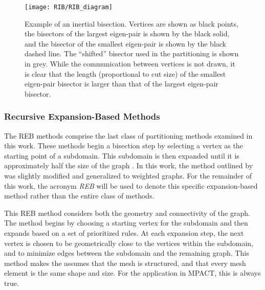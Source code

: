 {{{{        \begin{figure}
          \centering
          \texttt{[image: RIB/RIB\_diagram]}
          \caption{
            Example of an inertial bisection.
            Vertices are shown as black points, the bisectors of the largest eigen-pair is shown by the black solid, and the bisector of the smallest eigen-pair is shown by the black dashed line.
            The ``shifted'' bisector used in the partitioning is shown in grey.
            While the communication between vertices is not drawn, it is clear that the length (proportional to cut size) of the smallest eigen-pair bisector is larger than that of the largest eigen-pair bisector.
            \label{fig:Spatial Decomposition:RIB Diagram}
          }
        \end{figure}
      }
      \subsubsection{Recursive Expansion-Based Methods}{\label{sssec:Spatial Decomposition:Recursive Expansion-Based Methods}
        The \ac{REB} methods comprise the last class of partitioning methods examined in this work.
        These methods begin a bisection step by selecting a vertex as the starting point of a subdomain.
        This subdomain is then expanded until it is approximately half the size of the graph \cite{Farhat1988,Nasra1991,Elsner1997,Fitzgerald2017}.
        In this work, the method outlined by \citet{Fitzgerald2017} was slightly modified and generalized to weighted graphs.
        For the remainder of this work, the acronym \emph{\ac{REB}} will be used to denote this specific expansion-based method rather than the entire class of methods.

        This \ac{REB} method considers both the geometry and connectivity of the graph.
        The method begins by choosing a starting vertex for the subdomain and then expands based on a set of prioritized rules.
        At each expansion step, the next vertex is chosen to be  geometrically close to the vertices within the subdomain, and to minimize edges between the subdomain and the remaining graph.
        This method makes the assumes that the mesh is structured, and that every mesh element is the same shape and size.
        For the application in MPACT, this is always true.

}}}}
